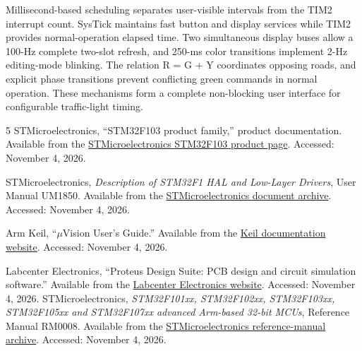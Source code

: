 \documentclass[a4paper]{article}
\begin{document}
Millisecond-based scheduling separates user-visible intervals from the TIM2
interrupt count. SysTick maintains fast button and display services while TIM2
provides normal-operation elapsed time. Two simultaneous display buses allow a
100-Hz complete two-slot refresh, and 250-ms color transitions implement 2-Hz
editing-mode blinking. The relation R = G + Y coordinates opposing roads,
and explicit phase transitions prevent conflicting green commands in normal
operation. These mechanisms form a complete non-blocking user interface for
configurable traffic-light timing.
\clearpage
{}
{}
\begin{thebibliography}{5}
STMicroelectronics, ``STM32F103 product family,'' product documentation.
Available from the
\href{https://www.st.com/en/microcontrollers-microprocessors/stm32f103.html}
{STMicroelectronics STM32F103 product page}.
Accessed: November 4, 2026.

STMicroelectronics, \emph{Description of STM32F1 HAL and Low-Layer Drivers},
User Manual UM1850. Available from the
\href{https://www.st.com/resource/en/user_manual/um1850-description-of-stm32f1-hal-and-lowlayer-drivers-stmicroelectronics.pdf}
{STMicroelectronics document archive}.
Accessed: November 4, 2026.

Arm Keil, ``\mbox{$\mu$Vision} User's Guide.'' Available from the
\href{https://www.keil.com/support/man/docs/uv4/default.htm}
{Keil documentation website}.
Accessed: November 4, 2026.

Labcenter Electronics, ``Proteus Design Suite: PCB design and circuit simulation
software.'' Available from the
\href{https://www.labcenter.com/}{Labcenter Electronics website}.
Accessed: November 4, 2026.
STMicroelectronics, \emph{STM32F101xx, STM32F102xx, STM32F103xx,
STM32F105xx and STM32F107xx advanced Arm-based 32-bit MCUs},
Reference Manual RM0008. Available from the
\href{https://www.st.com/resource/en/reference_manual/cd00171190-stm32f101-103-105-107-stm32f100-series-armbased-32bit-mcus-stmicroelectronics.pdf}
{STMicroelectronics reference-manual archive}.
Accessed: November 4, 2026.
\end{thebibliography}
\end{document}
